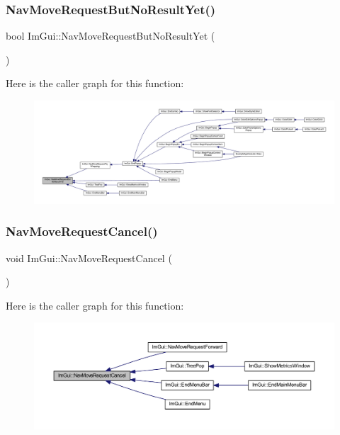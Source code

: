 \subsubsection{\texorpdfstring{Nav\+Move\+Request\+But\+No\+Result\+Yet()}{NavMoveRequestButNoResultYet()}}
{\footnotesize\ttfamily bool Im\+Gui\+::\+Nav\+Move\+Request\+But\+No\+Result\+Yet (\begin{DoxyParamCaption}{ }\end{DoxyParamCaption})}

Here is the caller graph for this function\+:
\nopagebreak
\begin{figure}[H]
\begin{center}
\leavevmode
\includegraphics[width=350pt]{namespace_im_gui_a3fab98556d11690efd4f7f2fde94968e_icgraph}
\end{center}
\end{figure}
\mbox{\label{namespace_im_gui_a43326bb080d9fa80327ed81d864d8b8d}} 
\subsubsection{\texorpdfstring{Nav\+Move\+Request\+Cancel()}{NavMoveRequestCancel()}}
{\footnotesize\ttfamily void Im\+Gui\+::\+Nav\+Move\+Request\+Cancel (\begin{DoxyParamCaption}{ }\end{DoxyParamCaption})}

Here is the caller graph for this function\+:
\nopagebreak
\begin{figure}[H]
\begin{center}
\leavevmode
\includegraphics[width=350pt]{namespace_im_gui_a43326bb080d9fa80327ed81d864d8b8d_icgraph}
\end{center}
\end{figure}
\mbox{\label{namespace_im_gui_a8a96ace94b2000ada6f21d7459d51920}} 

